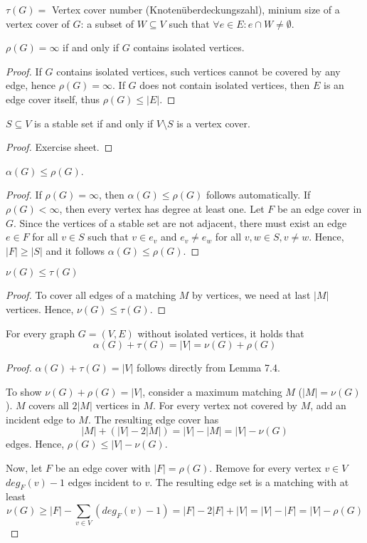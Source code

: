 $\tau(G) = $ Vertex cover number (Knotenüberdeckungszahl), minium size of a
vertex cover of $G$: a subset of $W \subseteq V$ such that $\forall e \in E:
e \cap W \neq \emptyset$.

\begin{lem}
$\rho(G) = \infty$ if and only if $G$ contains isolated vertices.
\end{lem}
\begin{proof}
If $G$ contains isolated vertices, such vertices cannot be covered by any
edge, hence $\rho(G) = \infty$. If $G$ does not contain isolated vertices,
then $E$ is an edge cover itself, thus $\rho(G) \leq |E|$.
\end{proof}

\begin{lem} %
$S \subseteq V$ is a stable set if and only if $V \setminus S$ is a vertex
cover.
\end{lem}
\begin{proof}
Exercise sheet.
\end{proof}

\begin{lem} %
$\alpha(G) \leq \rho(G)$.
\end{lem}
\begin{proof}
If $\rho(G) = \infty$, then $\alpha(G) \leq \rho(G)$ follows automatically.
If $\rho(G) < \infty$, then every vertex has degree at least one. Let $F$ be
an edge cover in $G$. Since the vertices of a stable set are not adjacent,
there must exist an edge $e \in F$ for all $v \in S$ such that $v \in e_v$
and $e_v \neq e_w$ for all $v, w \in S, v \neq w$. Hence, $|F| \geq |S|$ and
it follows $\alpha(G) \leq \rho(G)$.
\end{proof}

\begin{lem} %
$\nu(G) \leq \tau(G)$
\end{lem}
\begin{proof}
To cover all edges of a matching $M$ by vertices, we need at last $|M|$
vertices. Hence, $\nu(G) \leq \tau(G)$.
\end{proof}
\begin{thm}

For every graph $G = (V, E)$ without isolated vertices, it holds that
\[
\alpha(G) + \tau(G) = |V| = \nu(G) + \rho(G)
\]
\end{thm}
\begin{proof}
$\alpha(G) + \tau(G) = |V|$ follows directly from Lemma 7.4.

To show $\nu(G) + \rho(G) = |V|$, consider a maximum matching $M$ ($|M| =
\nu(G)$). $M$ covers all $2 |M|$ vertices in $M$. For every vertex not
covered by $M$, add an incident edge to $M$. The resulting edge cover has
\[
|M| + (|V| - 2 |M|) = |V| - |M| = |V| - \nu(G)
\] edges. Hence, $\rho(G) \leq
|V| - \nu(G)$.

Now, let $F$ be an edge cover with $|F| = \rho(G)$. Remove for every vertex
$v \in V$ $deg_F(v) - 1$ edges incident to $v$. The resulting edge set is a
matching with at least
\[
\nu(G) \geq |F| - \sum\limits_{v \in V} (deg_F(v) - 1) = |F| - 2 |F| + |V| = |V| - |F|
= |V| - \rho(G)
\]
\end{proof}

